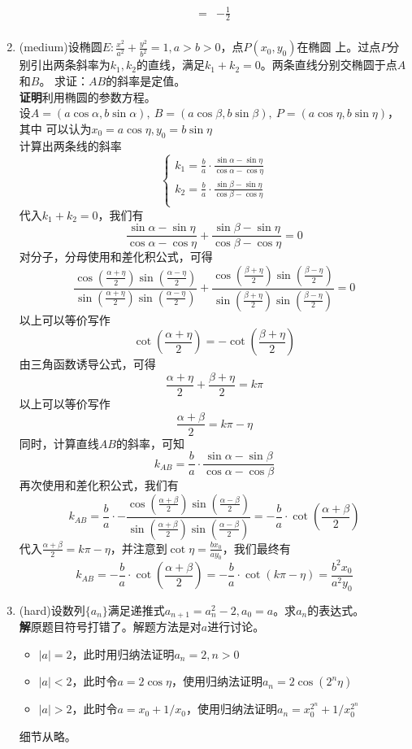 \documentclass[a4paper]{article}
\begin{document}
\begin{enumerate}
\[\begin{split}
=&-\frac{1}{2}\\
\end{split}
\]
\item (medium)设椭圆$E:\frac{x^2}{a^2}+\frac{y^2}{b^2}=1,a>b>0$，点$P(x_0,y_0)$在椭圆
上。过点$P$分别引出两条斜率为$k_1,k_2$的直线，满足$k_1+k_2=0$。两条直线分别交椭圆于点$A$和$B$。
求证：$AB$的斜率是定值。\\
\textbf{证明}\quad 利用椭圆的参数方程。\\
设$A=(a\cos \alpha,b\sin \alpha),~B=(a\cos \beta,b\sin\beta),~P=(a\cos \eta,b\sin\eta)$，其中
可以认为$x_0=a\cos\eta,y_0=b\sin\eta$\\
计算出两条线的斜率
\[
\left\{\begin{array}{l}
k_1=\frac{b}{a}\cdot \frac{\sin\alpha-\sin\eta}{\cos\alpha-\cos\eta}\\
k_2=\frac{b}{a}\cdot \frac{\sin\beta-\sin\eta}{\cos\beta-\cos\eta}\\
\end{array}
\right.
\]
代入$k_1+k_2=0$，我们有
\[
\frac{\sin\alpha-\sin\eta}{\cos\alpha-\cos\eta}+\frac{\sin\beta-\sin\eta}{\cos\beta-\cos\eta}=0
\]
对分子，分母使用和差化积公式，可得
\[
\frac{\cos(\frac{\alpha+\eta}{2})\sin(\frac{\alpha-\eta}{2})}{\sin(\frac{\alpha+\eta}{2})\sin(\frac{\alpha-\eta}{2})}+\frac{\cos(\frac{\beta+\eta}{2})\sin(\frac{\beta-\eta}{2})}{\sin(\frac{\beta+\eta}{2})\sin(\frac{\beta-\eta}{2})}=0
\]
以上可以等价写作
\[
\cot(\frac{\alpha+\eta}{2})=-\cot(\frac{\beta+\eta}{2})
\]
由三角函数诱导公式，可得
\[
\frac{\alpha+\eta}{2}+\frac{\beta+\eta}{2}=k\pi
\]
以上可以等价写作
\[
\frac{\alpha+\beta}{2}=k\pi-\eta
\]
同时，计算直线$AB$的斜率，可知
\[
k_{AB}=\frac{b}{a}\cdot \frac{\sin\alpha-\sin\beta}{\cos\alpha-\cos\beta}
\]
再次使用和差化积公式，我们有
\[
k_{AB}=\frac{b}{a}\cdot -\frac{\cos(\frac{\alpha+\beta}{2})\sin(\frac{\alpha-\beta}{2})}{\sin(\frac{\alpha+\beta}{2})\sin(\frac{\alpha-\beta}{2})}=-\frac{b}{a}\cdot \cot(\frac{\alpha+\beta}{2})
\]
代入$\frac{\alpha+\beta}{2}=k\pi-\eta$，并注意到$\cot\eta=\frac{bx_0}{ay_0}$，我们最终有
\[
k_{AB}=-\frac{b}{a}\cdot \cot(\frac{\alpha+\beta}{2})=-\frac{b}{a}\cdot \cot(k\pi-\eta)=\frac{b^2x_0}{a^2y_0}
\]
\item (hard)设数列$\{a_n\}$满足递推式\color{red}$a_{n+1}=a_n^2-2,a_0=a$\color{black}。求$a_n$的表达式。\\
\textbf{解}\quad 原题目符号打错了。解题方法是对$a$进行讨论。
\begin{itemize}
\item $|a|=2$，此时用归纳法证明$a_n=2,n > 0$
\item $|a|<2$，此时令$a=2\cos\eta$，使用归纳法证明$a_n=2\cos(2^{n}\eta)$
\item $|a|>2$，此时令$a=x_0+1/x_0$，使用归纳法证明$a_n=x_0^{2^n}+1/x_0^{2^n}$
\end{itemize}
细节从略。
\end{enumerate}
\end{document}
